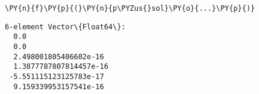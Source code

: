     \begin{tcolorbox}[breakable, size=fbox, boxrule=1pt, pad at break*=1mm,colback=cellbackground, colframe=cellborder]
\begin{Verbatim}[commandchars=\\\{\}]
\PY{n}{f}\PY{p}{(}\PY{n}{p\PYZus{}sol}\PY{o}{...}\PY{p}{)}
\end{Verbatim}
\end{tcolorbox}

            \begin{tcolorbox}[breakable, size=fbox, boxrule=.5pt, pad at break*=1mm, opacityfill=0]
\begin{Verbatim}[commandchars=\\\{\}]
6-element Vector\{Float64\}:
  0.0
  0.0
  2.498001805406602e-16
  1.3877787807814457e-16
 -5.551115123125783e-17
  9.159339953157541e-16
\end{Verbatim}
\end{tcolorbox}
